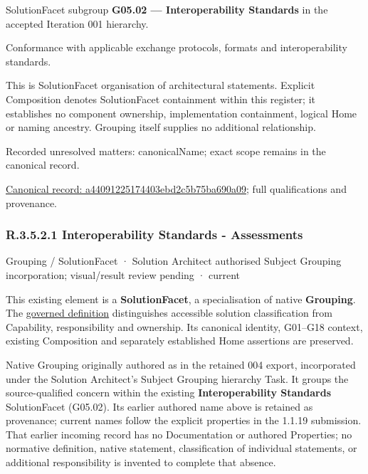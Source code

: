 SolutionFacet subgroup \textbf{G05.02 — Interoperability Standards} in the accepted Iteration 001 hierarchy.



Conformance with applicable exchange protocols, formats and interoperability standards.



This is SolutionFacet organisation of architectural statements. Explicit Composition denotes SolutionFacet containment within this register; it establishes no component ownership, implementation containment, logical Home or naming ancestry. Grouping itself supplies no additional relationship.


{\small Recorded unresolved matters: canonicalName; exact scope remains in the canonical record.}\par
{\footnotesize \href{../../../../../../../continuum/grouping/a44091225174403ebd2c5b75ba690a09.md}{Canonical record: a44091225174403ebd2c5b75ba690a09}; full qualifications and provenance.}\par
\subsubsection*{R.3.5.2.1 Interoperability Standards - Assessments}
\label{navigation:R.3.5.2.1}

\label{element:9020808d1ff9466db08ad2f8c9a97542}
{\small Grouping / SolutionFacet · Solution Architect authorised Subject Grouping incorporation; visual/result review pending · current}\par

This existing element is a \textbf{SolutionFacet}, a specialisation of native
\textbf{Grouping}. The \href{\detokenize{../../../../../../../governance/continuum-representation.md#solutionfacet-classification--1119-candidate}}{governed definition}
distinguishes accessible solution classification from Capability, responsibility
and ownership. Its canonical identity, G01–G18 context, existing Composition
and separately established Home assertions are preserved.



Native Grouping originally authored as \texttt{} in the retained 004 export,
incorporated under the Solution Architect's Subject Grouping hierarchy Task.
It groups the source-qualified \texttt{} concern within
the existing \textbf{Interoperability Standards} SolutionFacet (G05.02). Its earlier authored name above is retained as provenance; current names
follow the explicit properties in the 1.1.19 submission.
That earlier incoming record has no Documentation or authored Properties; no normative
definition, native statement, classification of individual statements, or
additional responsibility is invented to complete that absence.



